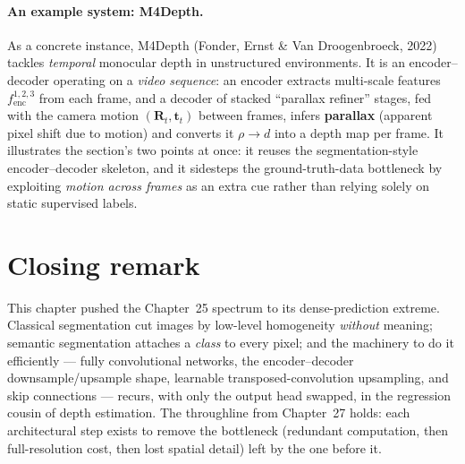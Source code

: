 \documentclass{report}
\begin{document}
\paragraph{An example system: M4Depth.} As a concrete instance, M4Depth (Fonder,
Ernst \& Van Droogenbroeck, 2022) tackles \emph{temporal} monocular depth in
unstructured environments. It is an encoder--decoder operating on a \emph{video
sequence}: an encoder extracts multi-scale features $f_{\text{enc}}^{1,2,3}$
from each frame, and a decoder of stacked ``parallax refiner'' stages, fed with
the camera motion $(\mathbf{R}_t,\mathbf{t}_t)$ between frames, infers
\textbf{parallax} (apparent pixel shift due to motion) and converts it
$\rho\!\to\! d$ into a depth map per frame. It illustrates the section's two
points at once: it reuses the segmentation-style encoder--decoder skeleton, and
it sidesteps the ground-truth-data bottleneck by exploiting \emph{motion across
frames} as an extra cue rather than relying solely on static supervised labels.

\section*{Closing remark}

This chapter pushed the Chapter~25 spectrum to its dense-prediction extreme.
Classical segmentation cut images by low-level homogeneity \emph{without}
meaning; semantic segmentation attaches a \emph{class} to every pixel; and the
machinery to do it efficiently --- fully convolutional networks, the
encoder--decoder downsample/upsample shape, learnable transposed-convolution
upsampling, and skip connections --- recurs, with only the output head swapped,
in the regression cousin of depth estimation. The throughline from Chapter~27
holds: each architectural step exists to remove the bottleneck (redundant
computation, then full-resolution cost, then lost spatial detail) left by the
one before it.
\end{document}
